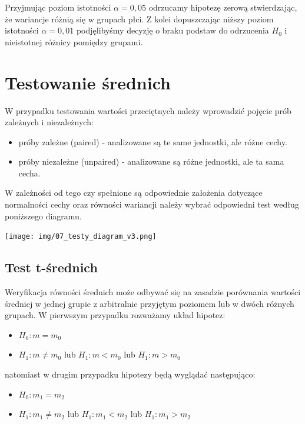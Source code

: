 \documentclass[]{book}
\providecommand{\tightlist}{%
  \setlength{\itemsep}{0pt}\setlength{\parskip}{0pt}}
\begin{document}
Przyjmując poziom istotności \(\alpha = 0,05\) odrzucamy hipotezę zerową stwierdzając, że wariancje różnią się w grupach płci. Z kolei dopuszczając niższy poziom istotności \(\alpha = 0,01\) podjęlibyśmy decyzję o braku podstaw do odrzucenia \(H_0\) i nieistotnej różnicy pomiędzy grupami.

\hypertarget{testowanie-srednich}{%
\section{Testowanie średnich}\label{testowanie-srednich}}

W przypadku testowania wartości przeciętnych należy wprowadzić pojęcie prób zależnych i niezależnych:

\begin{itemize}
\item
  próby zależne (paired) - analizowane są te same jednostki, ale różne cechy.
\item
  próby niezależne (unpaired) - analizowane są różne jednostki, ale ta sama cecha.
\end{itemize}

W zależności od tego czy spełnione są odpowiednie założenia dotyczące normalności cechy oraz równości wariancji należy wybrać odpowiedni test według poniższego diagramu.

\texttt{[image: img/07\_testy\_diagram\_v3.png]}

\hypertarget{test-t-srednich}{%
\subsection{Test t-średnich}\label{test-t-srednich}}

Weryfikacja równości średnich może odbywać się na zasadzie porównania wartości średniej w jednej grupie z arbitralnie przyjętym poziomem lub w dwóch różnych grupach. W pierwszym przypadku rozważamy układ hipotez:

\begin{itemize}
\tightlist
\item
  \(H_0: m = m_0\)
\item
  \(H_1: m \neq m_0\) lub \(H_1: m < m_0\) lub \(H_1: m > m_0\)
\end{itemize}

natomiast w drugim przypadku hipotezy będą wyglądać następująco:

\begin{itemize}
\tightlist
\item
  \(H_0: m_1 = m_2\)
\item
  \(H_1: m_1 \neq m_2\) lub \(H_1: m_1 < m_2\) lub \(H_1: m_1 > m_2\)
\end{itemize}
\end{document}
